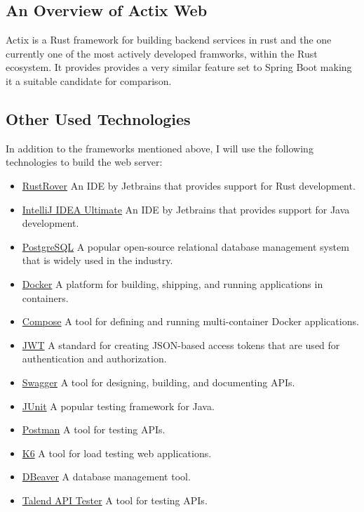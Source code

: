 \documentclass[a4paper,12pt]{article}
\begin{document}
	\subsection{An Overview of Actix Web}
	\label{subsec:actix_web}
	Actix is a Rust framework for building backend services in rust and the one currently one of the most actively developed framworks,
	within the Rust ecosystem. It provides provides a very similar feature set to Spring Boot making it a suitable candidate for comparison.

	\newpage
	\subsection{Other Used Technologies}
	\label{subsec:used_technologies}
	In addition to the frameworks mentioned above, I will use the following technologies to build the web server:
	\begin{itemize}
		\item \href{https://www.jetbrains.com/de-de/rust/}{RustRover} An IDE by Jetbrains that provides support for Rust development.
		\item \href{https://www.jetbrains.com/de-de/idea/}{IntelliJ IDEA Ultimate} An IDE by Jetbrains that provides support for Java development.
		\item \href{https://www.postgresql.org/}{PostgreSQL} A popular open-source relational database management system that is widely used in the industry.
		\item \href{https://www.docker.com/}{Docker} A platform for building, shipping, and running applications in containers.
		\item \href{https://docs.docker.com/compose/}{Compose} A tool for defining and running multi-container Docker applications.
		\item \href{https://jwt.io/}{JWT} A standard for creating JSON-based access tokens that are used for authentication and authorization.
		\item \href{https://swagger.io/}{Swagger}  A tool for designing, building, and documenting APIs.
		\item \href{https://junit.org/junit5/}{JUnit} A popular testing framework for Java.
		\item \href{https://www.postman.com/}{Postman} A tool for testing APIs.
		\item \href{https://k6.io/}{K6} A tool for load testing web applications.
		\item \href{https://dbeaver.io/}{DBeaver} A database management tool.
		\item \href{https://chromewebstore.google.com/detail/talend-api-tester-free-ed/aejoelaoggembcahagimdiliamlcdmfm}{Talend API Tester} A tool for testing APIs.
	\end{itemize}
\end{document}
